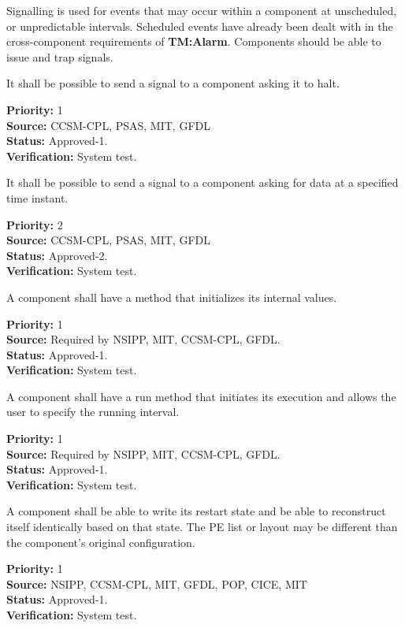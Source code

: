 
Signalling is used for events that may occur within a component at
unscheduled, or unpredictable intervals. Scheduled events have already
been dealt with in the cross-component requirements of
\textbf{TM:Alarm}. Components should be able to issue and trap signals.

It shall be possible to send a signal to a component asking it to
halt.
\begin{reqlist}
{\bf Priority:} 1 \\
{\bf Source:}  CCSM-CPL, PSAS, MIT, GFDL \\
{\bf Status:} Approved-1. \\
{\bf Verification:} System test.
\end{reqlist}

It shall be possible to send a signal to a component asking for data
at a specified time instant.
\begin{reqlist}
{\bf Priority:} 2\\
{\bf Source:}  CCSM-CPL, PSAS, MIT, GFDL \\
{\bf Status:} Approved-2. \\
{\bf Verification:} System test.
\end{reqlist}


A component shall have a method that initializes its internal values.
\begin{reqlist}
{\bf Priority:} 1\\
{\bf Source:} Required by NSIPP, MIT, CCSM-CPL, GFDL. \\
{\bf Status:} Approved-1.\\
{\bf Verification:} System test.
\end{reqlist}

A component shall have a run method that initiates its execution and
allows the user to specify the running interval. 
\begin{reqlist}
{\bf Priority:} 1\\
{\bf Source:} Required by NSIPP, MIT, CCSM-CPL, GFDL. \\
{\bf Status:} Approved-1.\\
{\bf Verification:} System test.
\end{reqlist}

A component shall be able to write its restart state and be able 
to reconstruct itself identically based on that state.  The PE list 
or layout may be different than the component's original configuration.  
\begin{reqlist}
{\bf Priority:} 1\\
{\bf Source:} NSIPP, CCSM-CPL, MIT, GFDL, POP, CICE, MIT \\
{\bf Status:} Approved-1.\\
{\bf Verification:} System test. \\
\end{reqlist}

